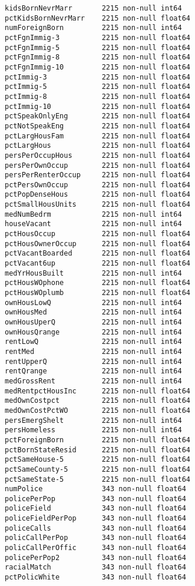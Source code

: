 \documentclass[11pt]{llncs}
\begin{document}
\begin{Verbatim}[commandchars=\\\{\}]
kidsBornNevrMarr       2215 non-null int64
pctKidsBornNevrMarr    2215 non-null float64
numForeignBorn         2215 non-null int64
pctFgnImmig-3          2215 non-null float64
pctFgnImmig-5          2215 non-null float64
pctFgnImmig-8          2215 non-null float64
pctFgnImmig-10         2215 non-null float64
pctImmig-3             2215 non-null float64
pctImmig-5             2215 non-null float64
pctImmig-8             2215 non-null float64
pctImmig-10            2215 non-null float64
pctSpeakOnlyEng        2215 non-null float64
pctNotSpeakEng         2215 non-null float64
pctLargHousFam         2215 non-null float64
pctLargHous            2215 non-null float64
persPerOccupHous       2215 non-null float64
persPerOwnOccup        2215 non-null float64
persPerRenterOccup     2215 non-null float64
pctPersOwnOccup        2215 non-null float64
pctPopDenseHous        2215 non-null float64
pctSmallHousUnits      2215 non-null float64
medNumBedrm            2215 non-null int64
houseVacant            2215 non-null int64
pctHousOccup           2215 non-null float64
pctHousOwnerOccup      2215 non-null float64
pctVacantBoarded       2215 non-null float64
pctVacant6up           2215 non-null float64
medYrHousBuilt         2215 non-null int64
pctHousWOphone         2215 non-null float64
pctHousWOplumb         2215 non-null float64
ownHousLowQ            2215 non-null int64
ownHousMed             2215 non-null int64
ownHousUperQ           2215 non-null int64
ownHousQrange          2215 non-null int64
rentLowQ               2215 non-null int64
rentMed                2215 non-null int64
rentUpperQ             2215 non-null int64
rentQrange             2215 non-null int64
medGrossRent           2215 non-null int64
medRentpctHousInc      2215 non-null float64
medOwnCostpct          2215 non-null float64
medOwnCostPctWO        2215 non-null float64
persEmergShelt         2215 non-null int64
persHomeless           2215 non-null int64
pctForeignBorn         2215 non-null float64
pctBornStateResid      2215 non-null float64
pctSameHouse-5         2215 non-null float64
pctSameCounty-5        2215 non-null float64
pctSameState-5         2215 non-null float64
numPolice              343 non-null float64
policePerPop           343 non-null float64
policeField            343 non-null float64
policeFieldPerPop      343 non-null float64
policeCalls            343 non-null float64
policCallPerPop        343 non-null float64
policCallPerOffic      343 non-null float64
policePerPop2          343 non-null float64
racialMatch            343 non-null float64
pctPolicWhite          343 non-null float64

\end{Verbatim}
\end{document}
